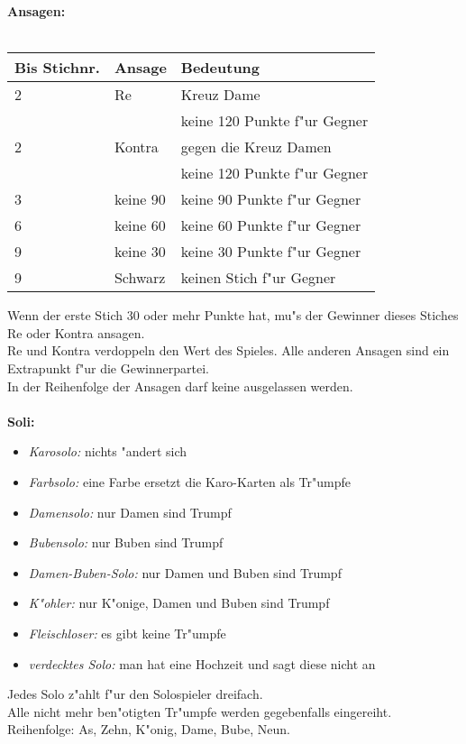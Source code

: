 \documentclass[a4paper,11pt,twocolumn]{article}
\begin{document}
\newpage
\textbf{Ansagen:}\ \\
\smallskip\ \\
\begin{tabular}{lll}
Bis Stichnr. & Ansage & Bedeutung\\\hline
2 & Re  & Kreuz Dame \\
  &     & keine 120 Punkte f"ur Gegner\\
2 & Kontra & gegen die Kreuz Damen \\
  &        & keine 120 Punkte f"ur Gegner\\
3 & keine 90 & keine 90 Punkte f"ur Gegner\\
6 & keine 60 & keine 60 Punkte f"ur Gegner\\
9 & keine 30 & keine 30 Punkte f"ur Gegner\\
9 & Schwarz & keinen Stich f"ur Gegner\\
\end{tabular}
\medskip

Wenn der erste Stich 30 oder mehr Punkte hat, mu"s der Gewinner dieses Stiches
Re oder Kontra ansagen.\\
Re und Kontra verdoppeln den Wert des Spieles. Alle anderen Ansagen sind ein
Extrapunkt f"ur die Gewinnerpartei.\\
In der Reihenfolge der Ansagen darf keine ausgelassen werden.
\ \\
\smallskip
\ \\
\textbf{Soli:}
\begin{itemize}
\item \textit{Karosolo:} nichts "andert sich
\item \textit{Farbsolo:} eine Farbe ersetzt die Karo-Karten als Tr"umpfe
\item \textit{Damensolo:} nur Damen sind Trumpf
\item \textit{Bubensolo:} nur Buben sind Trumpf
\item \textit{Damen-Buben-Solo:} nur Damen und Buben sind Trumpf
\item \textit{K"ohler:} nur K"onige, Damen und Buben sind Trumpf
\item \textit{Fleischloser:} es gibt keine Tr"umpfe
\item \textit{verdecktes Solo:} man hat eine Hochzeit und sagt diese nicht an
\end{itemize}
Jedes Solo z"ahlt f"ur den Solospieler dreifach.\\
Alle nicht mehr ben"otigten Tr"umpfe werden gegebenfalls eingereiht. Reihenfolge:
As, Zehn, K"onig, Dame, Bube, Neun.
\end{document}
